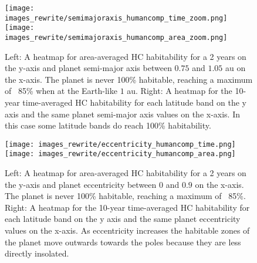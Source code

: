 \documentclass[12pt, onecolumn]{revtex4-2}    %
\begin{document}
\begin{figure}[t]
  \texttt{[image: images\_rewrite/semimajoraxis\_humancomp\_time\_zoom.png]}
  \texttt{[image: images\_rewrite/semimajoraxis\_humancomp\_area\_zoom.png]}
  \caption{
    Left: A heatmap for area-averaged HC habitability for a 2 years on the y-axis and planet semi-major axis between $0.75$ and $1.05$ au on the x-axis.
    The planet is never 100\% habitable, reaching a maximum of ~85\% when at the Earth-like $1$ au.
    Right: A heatmap for the 10-year time-averaged HC habitability for each latitude band on the y axis and the same planet semi-major axis values on the x-axis.
    In this case some latitude bands do reach 100\% habitability.
  }
  \label{fig:qualitative_semimajoraxis}
\end{figure}

\begin{figure}[t]
  \texttt{[image: images\_rewrite/eccentricity\_humancomp\_time.png]}
  \texttt{[image: images\_rewrite/eccentricity\_humancomp\_area.png]}
  \caption{
    Left: A heatmap for area-averaged HC habitability for a 2 years on the y-axis and planet eccentricity between $0$ and $0.9$ on the x-axis.
    The planet is never 100\% habitable, reaching a maximum of ~85\%.
    Right: A heatmap for the 10-year time-averaged HC habitability for each latitude band on the y axis and the same planet eccentricity values on the x-axis.
    As eccentricity increases the habitable zones of the planet move outwards towards the poles because they are less directly insolated.
  }
  \label{fig:qualitative_eccentricity}
\end{figure}
\end{document}
